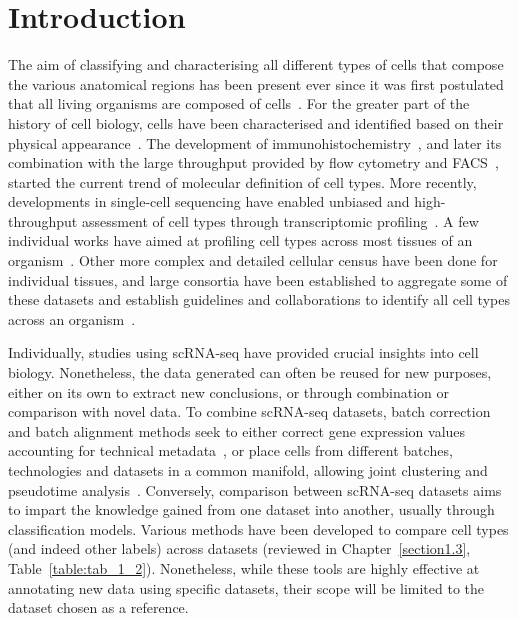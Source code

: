 \section{Introduction}
\label{section3.1}
The aim of classifying and characterising all different types of cells that compose the various anatomical regions has been present ever since it was first postulated that all living organisms are composed of cells~\citep{schwann_microscopical_1847}. For the greater part of the history of cell biology, cells have been characterised and identified based on their physical appearance~\citep{mazzarello_unifying_1999}. The development of immunohistochemistry~\citep{coons_immunological_1941}, and later its combination with the large throughput provided by flow cytometry and FACS~\citep{hulett_cell_1969,bonner_fluorescence_1972}, started the current trend of molecular definition of cell types. More recently, developments in single-cell sequencing have enabled unbiased and high-throughput assessment of cell types through transcriptomic profiling~\citep{svensson_exponential_2018}. A few individual works have aimed at profiling cell types across most tissues of an organism~\citep{fincher_cell_2018,plass_cell_2018,han_mapping_2018,noauthor_single-cell_2018}. Other more complex and detailed cellular census have been done for individual tissues, and large consortia have been established to aggregate some of these datasets and establish guidelines and collaborations to identify all cell types across an organism~\citep{regev_human_2017}.

Individually, studies using scRNA-seq have provided crucial insights into cell biology. Nonetheless, the data generated can often be reused for new purposes, either on its own to extract new conclusions, or through combination or comparison with novel data. To combine scRNA-seq datasets, batch correction and batch alignment methods seek to either correct gene expression values accounting for technical metadata~\citep{ritchie_limma_2015,johnson_adjusting_2007,buettner_f-sclvm:_2017,haghverdi_batch_2018,buttner_test_2019}, or place cells from different batches, technologies and datasets in a common manifold, allowing joint clustering and pseudotime analysis~\citep{butler_integrating_2018,polanski_bbknn:_2019,hie_efficient_2019,korsunsky_fast_2018,stuart_comprehensive_2019}. Conversely, comparison between scRNA-seq datasets aims to impart the knowledge gained from one dataset into another, usually through classification models. Various methods have been developed to compare cell types (and indeed other labels) across datasets (reviewed in Chapter~\ref{section1.3}, Table~\ref{table:tab_1_2}). Nonetheless, while these tools are highly effective at annotating new data using specific datasets, their scope will be limited to the dataset chosen as a reference.

